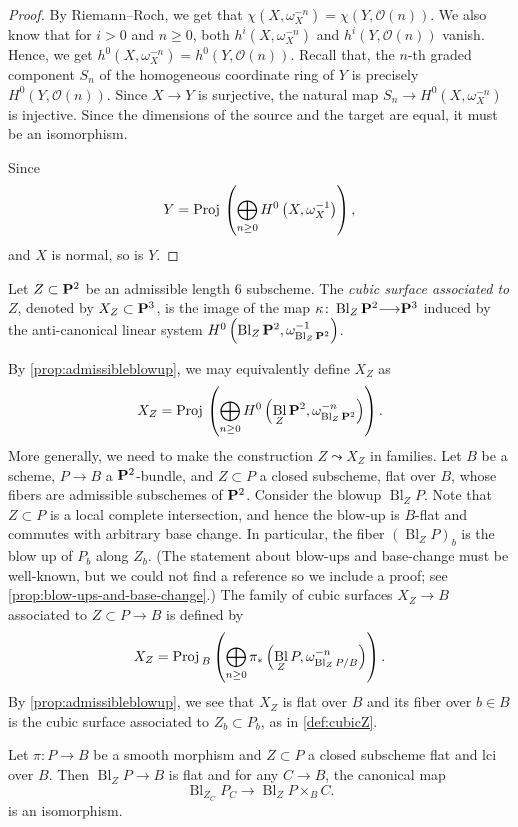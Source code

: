 \documentclass[12pt,reqno]{amsart}
\DeclareMathOperator{\Bl}{Bl}
\renewcommand{\to}{{\longrightarrow}}
\numberwithin{equation}{section}
\renewcommand{\O}{\mathcal O}
\newcommand{\Proj}{{\text{\rm Proj}\,}}
\begin{document}
\begin{proof}
  By Riemann--Roch, we get that $\chi(X,\omega_X^{-n}) = \chi(Y, \O(n))$.
  We also know that for $i > 0$ and $n \geq 0$, both $h^i(X, \omega_X^{-n})$ and $h^i(Y, \O(n))$ vanish.
  Hence, we get $h^0(X, \omega_X^{-n}) = h^0(Y, \O(n))$.
  Recall that, the $n$-th graded component $S_n$ of the homogeneous coordinate ring of $Y$ is precisely $H^0(Y, \O(n))$.
  Since $X \to Y$ is surjective, the natural map $S_n \to H^0(X, \omega_X^{-n})$ is injective.
  Since the dimensions of the source and the target are equal, it must be an isomorphism.

  Since
  \[ Y = \Proj\left( \bigoplus_{n \geq 0}H^0\left(X, \omega_X^{-1} \right) \right),\]
  and $X$ is normal, so is $Y$.
\end{proof}

\begin{definition}
  \label{def:cubicZ} Let $Z \subset \P^2$ be an admissible length $6$
  subscheme.  The \emph{cubic surface associated to $Z$}, denoted by
  $X_Z \subset \P^3$, is the image of the map
  $\kappa \colon \Bl_{Z}\P^2 \to \P^3$ induced by the anti-canonical linear system $H^0\left(\Bl_Z\P^2, \omega_{\Bl_Z\P^2}^{-1}\right)$.
\end{definition}
By \autoref{prop:admissibleblowup}, we may equivalently define $X_Z$ as
\[ X_Z = \Proj \left( \bigoplus_{n \geq 0} H^0\left( \Bl_Z\P^2, \omega_{\Bl_Z\P^2}^{-n} \right) \right).\]
More generally, we need to make the construction $Z \leadsto X_Z$ in families.
Let $B$ be a scheme, $P \to B$ a $\P^2$-bundle, and $Z \subset  P$ a closed subscheme, flat over $B$, whose fibers are admissible subschemes of $\P^2$.
Consider the blowup $\Bl_{ Z}  P$.
Note that $Z \subset  P$ is a local complete intersection, and hence the blow-up is $B$-flat and commutes with arbitrary base change.
In particular, the fiber $(\Bl_ZP)_b$ is the blow up of $P_b$ along $Z_b$.
(The statement about blow-ups and base-change must be well-known, but we could not find a reference so we include a proof; see \autoref{prop:blow-ups-and-base-change}.)
The family of cubic surfaces $X_Z \to B$ associated to $Z \subset P \to B$ is defined by
\[
  X_Z = \Proj_B \left(\bigoplus_{n \geq 0}\pi_*\left(\Bl_ZP, \omega_{\Bl_ZP/B}^{-n}\right)\right).
\]
By \autoref{prop:admissibleblowup}, we see that $X_Z$ is flat over $B$
and its fiber over $b \in B$ is the cubic surface associated to
$Z_b \subset P_b$, as in \autoref{def:cubicZ}.
\begin{proposition}\label{prop:blow-ups-and-base-change}
  Let $\pi \colon P \to B$ be a smooth morphism and $Z \subset P$ a closed subscheme flat and lci over $B$.
  Then $\Bl_ZP \to B$ is flat and for any $C \to B$, the canonical map
  \[  \Bl_{Z_C} P_C \to \Bl_ZP \times_B C.\]
  is an isomorphism.
\end{proposition}
\end{document}
